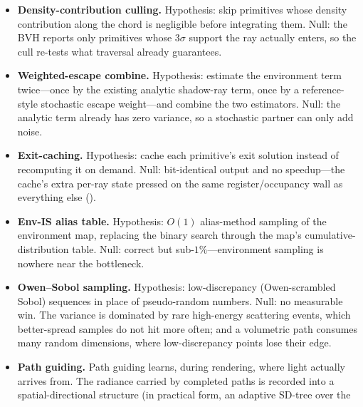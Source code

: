\begin{itemize}
  environment), while the environment-lit
  showcase (the target) is already won by MIS (). One hybrid remains untested:
  keep the argmin's single trace for choosing scatter points, but also carry the analytic
  segment transmittance in the path weight at every bounce, reweighted to stay unbiased. It was not built here: the flat-lighting regime it would help
is not the target regime, and the showcase comparison is already in this renderer's favour
without it. Whether it inherits
the smooth-weight benefit without a new cost is therefore unknown; it is the direction to
try should the flat gap ever matter.
  \item \textbf{Density-contribution culling.} Hypothesis: skip primitives whose density
  contribution along the chord is negligible before integrating them. Null: the BVH reports only
  primitives whose $3\sigma$ support the ray actually enters, so the cull re-tests what traversal
  already guarantees.
  \item \textbf{Weighted-escape combine.} Hypothesis: estimate the environment term
  twice---once by the existing analytic shadow-ray term, once by a reference-style stochastic
  escape weight---and combine the two estimators. Null: the analytic term already has zero
  variance, so a stochastic partner can only add noise.
  \item \textbf{Exit-caching.} Hypothesis: cache each primitive's exit solution instead of
  recomputing it on demand. Null: bit-identical output and no speedup---the cache's extra per-ray
  state pressed on the same register/occupancy wall as everything else ().
  \item \textbf{Env-IS alias table.} Hypothesis: $O(1)$ alias-method sampling of the environment map, replacing the binary
search through the map's cumulative-distribution table. Null: correct but sub-$1\%$---environment sampling is
  nowhere near the bottleneck.
  \item \textbf{Owen--Sobol sampling.} Hypothesis: low-discrepancy (Owen-scrambled Sobol) sequences
  in place of pseudo-random numbers. Null: no measurable win. The variance is dominated by rare high-energy scattering events,
which better-spread samples do not hit more often; and a volumetric path consumes many
random dimensions, where low-discrepancy points lose their edge.
  \item \textbf{Path guiding.} Path guiding learns, during rendering,
  where light actually arrives from. The radiance carried by completed paths is recorded into a
  spatial-directional structure (in practical form, an adaptive SD-tree over the

\end{itemize}
